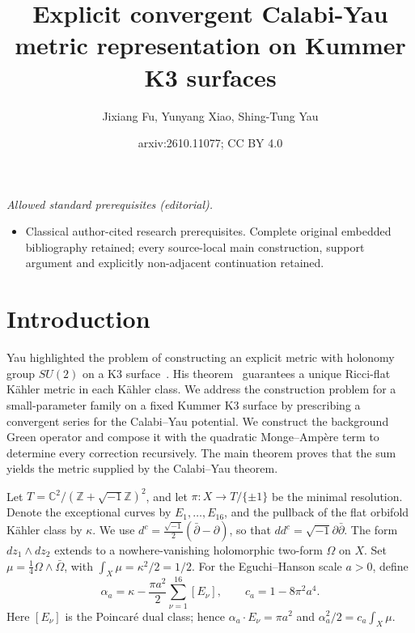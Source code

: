 \documentclass[11pt,a4paper,twoside]{article}
\title{Explicit convergent Calabi-Yau metric representation on Kummer K3 surfaces}
\author{Jixiang Fu, Yunyang Xiao, Shing-Tung Yau}
\date{arxiv:2610.11077; CC BY 4.0}
\numberwithin{equation}{section}
\theoremstyle{definition}
\theoremstyle{remark}
\newcommand{\ii}{\sqrt{-1}}
\begin{document}
\maketitle
\noindent\textit{Allowed standard prerequisites (editorial).}\begin{itemize}
\item Classical author-cited research prerequisites. Complete original embedded bibliography retained; every source-local main construction, support argument and explicitly non-adjacent continuation retained.
\end{itemize}\medskip
\section{Introduction}
\label{sec:introduction}
Yau highlighted the problem of constructing an explicit metric
with holonomy group \(SU(2)\) on a K3
surface~\cite[pp.~333--334]{YauGeometricStructure}.
His theorem~\cite{Yau1978} guarantees a unique Ricci-flat K\"ahler
metric in each K\"ahler class. We address the construction problem
for a small-parameter family on a fixed Kummer K3 surface by
prescribing a convergent series for the Calabi--Yau potential.
We construct the background Green operator and compose it with
the quadratic Monge--Amp\`ere term to determine every correction
recursively. The main theorem proves that the sum yields the metric
supplied by the Calabi--Yau theorem.


Let \(T=\mathbb C^2/(\mathbb Z+\ii\mathbb Z)^2\), and let
\(\pi:X\to T/\{\pm1\}\) be the minimal resolution. Denote the
exceptional curves by \(E_1,\ldots,E_{16}\), and the pullback of
the flat orbifold K\"ahler class by \(\kappa\). We use
\(d^c=\frac{\ii}{2}(\bar\partial-\partial)\), so that
\(dd^c=\ii\partial\bar\partial\). The form \(dz_1\wedge dz_2\)
extends to a nowhere-vanishing holomorphic two-form \(\Omega\)
on \(X\). Set \(\mu=\frac14\Omega\wedge\bar\Omega\), with
\(\int_X\mu=\kappa^2/2=1/2\). For the Eguchi--Hanson scale
\(a>0\), define
\begin{equation}\label{eq:intro-kummer-class}
\alpha_a=\kappa-\frac{\pi a^2}{2}\sum_{\nu=1}^{16}[E_\nu],
\qquad c_a=1-8\pi^2a^4.
\end{equation}
Here \([E_\nu]\) is the Poincar\'e dual class; hence
\(\alpha_a\cdot E_\nu=\pi a^2\) and
\(\alpha_a^2/2=c_a\int_X\mu\).
\end{document}
